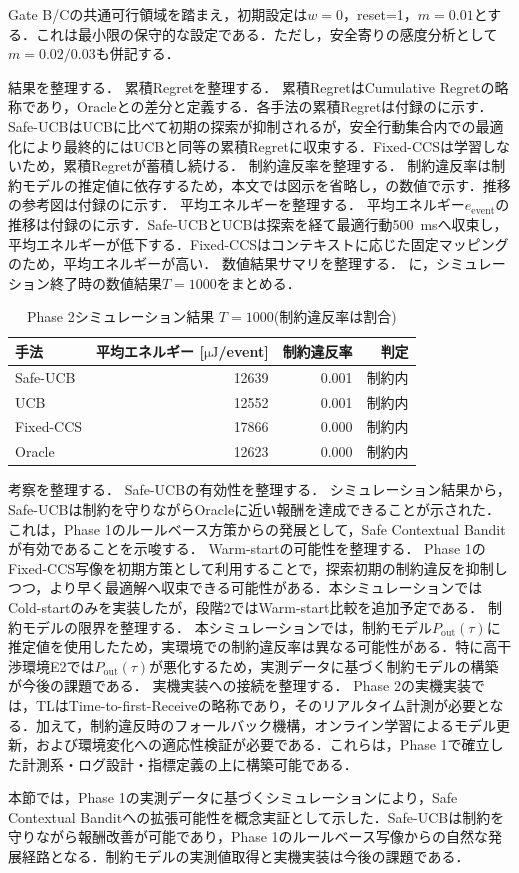 Gate B/Cの共通可行領域を踏まえ，初期設定は$w=0$，reset=1，$m=0.01$とする．これは最小限の保守的な設定である．ただし，安全寄りの感度分析として$m=0.02/0.03$も併記する．

結果を整理する．
累積Regretを整理する．
累積RegretはCumulative Regretの略称であり，Oracleとの差分と定義する．各手法の累積Regretは付録のに示す．Safe-UCBはUCBに比べて初期の探索が抑制されるが，安全行動集合内での最適化により最終的にはUCBと同等の累積Regretに収束する．Fixed-CCSは学習しないため，累積Regretが蓄積し続ける．
制約違反率を整理する．
制約違反率は制約モデルの推定値に依存するため，本文では図示を省略し，の数値で示す．推移の参考図は付録のに示す．
平均エネルギーを整理する．
平均エネルギー$e_{\mathrm{event}}$の推移は付録のに示す．Safe-UCBとUCBは探索を経て最適行動\SI{500}{\milli\second}へ収束し，平均エネルギーが低下する．Fixed-CCSはコンテキストに応じた固定マッピングのため，平均エネルギーが高い．
数値結果サマリを整理する．
に，シミュレーション終了時の数値結果$T=1000$をまとめる．

\begin{table}[tb]
  \centering
  \caption{Phase 2シミュレーション結果 $T=1000$(制約違反率は割合)}
  \label{tab:phase2_summary}
  \begin{tabular}{lrrr}
    \toprule
    手法 & 平均エネルギー [$\si{\micro\joule}$/event] & 制約違反率 & 判定 \\
    \midrule
    Safe-UCB & 12639 & 0.001 & 制約内 \\
    UCB & 12552 & 0.001 & 制約内 \\
    Fixed-CCS & 17866 & 0.000 & 制約内 \\
    Oracle & 12623 & 0.000 & 制約内 \\
    \bottomrule
  \end{tabular}
\end{table}

考察を整理する．
Safe-UCBの有効性を整理する．
シミュレーション結果から，Safe-UCBは制約を守りながらOracleに近い報酬を達成できることが示された．これは，Phase 1のルールベース方策からの発展として，Safe Contextual Banditが有効であることを示唆する．
Warm-startの可能性を整理する．
Phase 1のFixed-CCS写像を初期方策として利用することで，探索初期の制約違反を抑制しつつ，より早く最適解へ収束できる可能性がある．本シミュレーションではCold-startのみを実装したが，段階2ではWarm-start比較を追加予定である．
制約モデルの限界を整理する．
本シミュレーションでは，制約モデル$P_{\mathrm{out}}(\tau)$に推定値を使用したため，実環境での制約違反率は異なる可能性がある．特に高干渉環境E2では$P_{\mathrm{out}}(\tau)$が悪化するため，実測データに基づく制約モデルの構築が今後の課題である．
実機実装への接続を整理する．
Phase 2の実機実装では，TLはTime-to-first-Receiveの略称であり，そのリアルタイム計測が必要となる．加えて，制約違反時のフォールバック機構，オンライン学習によるモデル更新，および環境変化への適応性検証が必要である．これらは，Phase 1で確立した計測系・ログ設計・指標定義の上に構築可能である．

本節では，Phase 1の実測データに基づくシミュレーションにより，Safe Contextual Banditへの拡張可能性を概念実証として示した．Safe-UCBは制約を守りながら報酬改善が可能であり，Phase 1のルールベース写像からの自然な発展経路となる．制約モデルの実測値取得と実機実装は今後の課題である．













